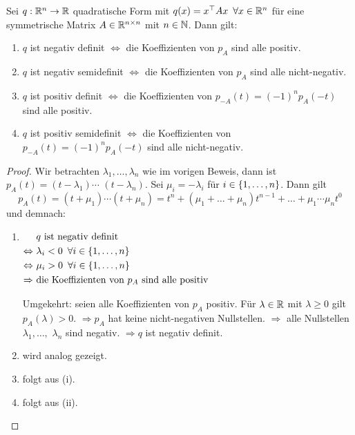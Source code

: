 \begin{thm}
	Sei $ q : \mathbb R^n \to \mathbb R $ quadratische Form mit $ q(x) = x^\top A x \enspace \forall x \in \mathbb R^n $ für eine symmetrische Matrix $ A \in \mathbb R^{n \times n} $ mit $ n \in \mathbb N $. Dann gilt:
	\begin{enumerate}
		\item
			$ q $ ist negativ definit $ \Leftrightarrow $ die Koeffizienten von $ p_A $ sind alle positiv.
		\item
			$ q $ ist negativ semidefinit $ \Leftrightarrow $ die Koeffizienten von $ p_A $ sind alle nicht-negativ.
		\item
			$ q $ ist positiv definit $ \Leftrightarrow $ die Koeffizienten von $ p_{-A}(t) = (-1)^n p_A(-t) $ sind alle positiv.
		\item
			$ q $ ist positiv semidefinit $ \Leftrightarrow $ die Koeffizienten von $ p_{-A}(t) = (-1)^n p_A(-t) $ sind alle nicht-negativ.
	\end{enumerate}
\end{thm}
\begin{proof}
	Wir betrachten $ \lambda_1, \ldots, \lambda_n $ wie im vorigen Beweis, dann ist $ p_A(t) = (t-\lambda_1) \cdots $ $ (t-\lambda_n) $. Sei $ \mu_i = - \lambda_i $ für $ i \in \{ 1,\ldots,n \} $. Dann gilt
	\begin{equation*}
		p_A(t) = (t+\mu_1) \cdots (t+\mu_n) = t^n + (\mu_1 + \ldots + \mu_n)t^{n-1} + \ldots + \mu_1 \cdots \mu_n t^0
	\end{equation*}
	und demnach:
	\begin{enumerate}
		\item
			$ \begin{aligned}[t]
				&\ q \text{ ist negativ definit} \\
				\Leftrightarrow&\ \lambda_i < 0 \enspace \forall i \in \{ 1,\ldots,n \} \\
				\Leftrightarrow&\ \mu_i > 0 \enspace \forall i \in \{ 1,\ldots,n \} \\
				\Rightarrow&\ \text{die Koeffizienten von } p_A \text{ sind alle positiv}
			\end{aligned} $
			
			Umgekehrt: seien alle Koeffizienten von $ p_A $ positiv. Für $ \lambda \in \mathbb R $ mit $ \lambda \geq 0 $ gilt $ p_A(\lambda) > 0 $. $ \Rightarrow p_A $ hat keine nicht-negativen Nullstellen. $ \Rightarrow $ alle Nullstellen $ \lambda_1, \ldots, $ $ \lambda_n $ sind negativ. $ \Rightarrow q $ ist negativ definit.
		\item
			wird analog gezeigt.
		\item
			folgt aus (i).
		\item
			folgt aus (ii). \qedhere
	\end{enumerate}
\end{proof}

